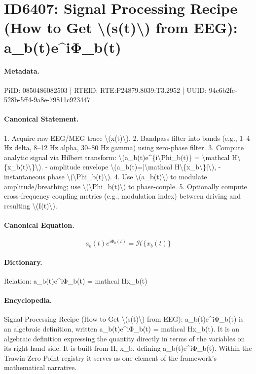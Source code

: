 \section*{ID6407: Signal Processing Recipe (How to Get \textbackslash{}(s(t)\textbackslash{}) from EEG): a\_b(t)e\textasciicircum{}iΦ\_b(t)}
\paragraph{Metadata.}
PiID: 0850486082503 | RTEID: RTE:P24879.8039:T3.2952 | UUID: 94c6b2fc-528b-5ff4-9a8e-79811c923447

\paragraph{Canonical Statement.}
1. Acquire raw EEG/MEG trace \textbackslash{}(x(t)\textbackslash{}). 2. Bandpass filter into bands (e.g., 1–4 Hz delta, 8–12 Hz alpha, 30–80 Hz gamma) using zero-phase filter. 3. Compute analytic signal via Hilbert transform: \textbackslash{}(a\_b(t)e\textasciicircum{}\{i\textbackslash{}Phi\_b(t)\} = \textbackslash{}mathcal H\textbackslash{}\{x\_b(t)\textbackslash{}\}\textbackslash{}). - amplitude envelope \textbackslash{}(a\_b(t)=|\textbackslash{}mathcal H\textbackslash{}\{x\_b\textbackslash{}\}|\textbackslash{}), - instantaneous phase \textbackslash{}(\textbackslash{}Phi\_b(t)\textbackslash{}). 4. Use \textbackslash{}(a\_b(t)\textbackslash{}) to modulate amplitude/breathing; use \textbackslash{}(\textbackslash{}Phi\_b(t)\textbackslash{}) to phase-couple. 5. Optionally compute cross-frequency coupling metrics (e.g., modulation index) between driving and resulting \textbackslash{}(I(t)\textbackslash{}).

\paragraph{Canonical Equation.}
\[
a_b(t)e^{i\Phi_b(t)} = \mathcal H\{x_b(t)\}
\]

\paragraph{Dictionary.}
Relation: a\_b(t)e\textasciicircum{}iΦ\_b(t) = mathcal Hx\_b(t)

\paragraph{Encyclopedia.}
Signal Processing Recipe (How to Get \textbackslash{}(s(t)\textbackslash{}) from EEG): a\_b(t)e\textasciicircum{}iΦ\_b(t) is an algebraic definition, written a\_b(t)e\textasciicircum{}iΦ\_b(t) = mathcal Hx\_b(t). It is an algebraic definition expressing the quantity directly in terms of the variables on its right-hand side. It is built from H, x\_b, defining a\_b(t)e\textasciicircum{}iΦ\_b(t). Within the Trawin Zero Point registry it serves as one element of the framework's mathematical narrative.
